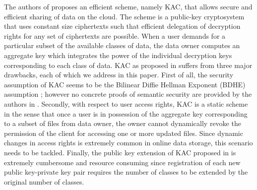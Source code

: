 The authors of \cite{chu2014key} proposes an efficient scheme, namely KAC, that allows secure and efficient sharing of data on the cloud. The scheme is a public-key cryptosystem that uses constant size ciphertexts such that efficient delegation of decryption rights for any set of ciphertexts are possible. When a user demands for a particular subset of the available classes of data, the data owner computes an aggregate key which integrates the power of the individual decryption keys corresponding to each class of data. KAC as proposed in \cite{chu2014key} suffers from three major drawbacks, each of which we address in this paper. First of all, the security assumption of KAC seems to be the Bilinear Diffie Hellman Exponent (BDHE) assumption \cite{miller1986use}; however no concrete proofs of semantic security are provided by the authors in \cite{chu2014key}. Secondly, with respect to user access rights, KAC is a static scheme in the sense that once a user is in possession of the aggregate key corresponding to a subset of files from data owner, the owner cannot dynamically revoke the permission of the client for accessing one or more updated files. Since dynamic changes in access rights is extremely common in online data storage, this scenario needs to be tackled. Finally, the public key extension of KAC proposed in \cite{chu2014key} is extremely cumbersome and resource consuming since registration of each new public key-private key pair requires the number of classes to be extended by the original number of classes.  





